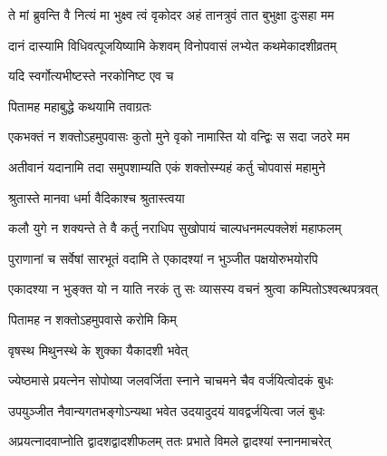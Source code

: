 \twolineshloka
{ते मां ब्रुवन्ति वै नित्यं मा भुक्ष्व त्वं वृकोदर}
{अहं तानत्रुवं तात बुभुक्षा दुःसहा मम} %

\twolineshloka
{दानं दास्यामि विधिवत्पूजयिष्यामि केशवम्}
{विनोपवासं लभ्येत कथमेकादशीव्रतम्} %



\onelineshloka
{यदि स्वर्गोत्यभीष्टस्ते नरकोनिष्ट एव च} %



\onelineshloka
{पितामह महाबुद्धे कथयामि तवाग्रतः} %

\twolineshloka
{एकभक्तं न शक्तोऽहमुपवासः कुतो मुने}
{वृको नामास्ति यो वन्द्विः स सदा जठरे मम} %

\twolineshloka
{अतीवानं यदानामि तदा समुपशाम्यति}
{एकं शक्तोस्म्यहं कर्तु चोपवासं महामुने} %



\onelineshloka
{श्रुतास्ते मानवा धर्मा वैदिकाश्च श्रुतास्त्वया} %

\twolineshloka
{कलौ युगे न शक्यन्ते ते वै कर्तु नराधिप}
{सुखोपायं चाल्पधनमल्पक्लेशं महाफलम्} %

\twolineshloka
{पुराणानां च सर्वेषां सारभूतं वदामि ते}
{एकादश्यां न भुञ्जीत पक्षयोरुभयोरपि} %

\twolineshloka
{एकादश्या न भुङ्क्त यो न याति नरकं तु सः}
{व्यासस्य वचनं श्रुत्वा कम्पितोऽश्वत्थपत्रवत्} %



\onelineshloka
{पितामह न शक्तोऽहमुपवासे करोमि किम्} %



\onelineshloka
{वृषस्थ मिथुनस्थे के शुक्का यैकादशी भवेत्} %

\twolineshloka
{ज्येष्ठमासे प्रयत्नेन सोपोष्या जलवर्जिता}
{स्नाने चाचमने चैव वर्जयित्वोदकं बुधः} %

\twolineshloka
{उपयुञ्जीत नैवान्यगतभङ्गोऽन्यथा भवेत}
{उदयादुदयं यावद्वर्जयित्वा जलं बुधः} %

\twolineshloka
{अप्रयत्नादवाप्नोति द्वादशद्वादशीफलम्}
{ततः प्रभाते विमले द्वादश्यां स्नानमाचरेत्} %

